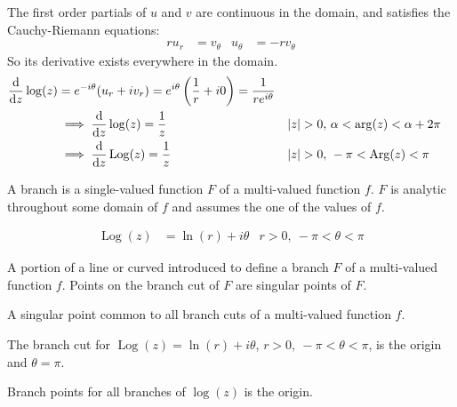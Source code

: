 \documentclass[12pt, english]{book}
\begin{document}
	The first order partials of \(u\) and \(v\) are continuous in the domain, and satisfies the Cauchy-Riemann equations:
	\begin{align*}
		ru_r &= v_\theta & u_\theta &= -rv_\theta
	\end{align*}
	So its derivative exists everywhere in the domain. 
	\begin{align*}
		\dv{z} \log(z) &= e^{-i\theta} (u_r + iv_r) = e^{i\theta} \left(\frac{1}{r} + i0\right) = \frac{1}{re^{i\theta}} \\
		&\implies \dv{z} \log(z) = \frac{1}{z} & \abs{z}>0,& \ \alpha < \arg(z) < \alpha + 2\pi\\
		&\implies \dv{z} \operatorname{Log}(z) = \frac{1}{z} & \abs{z}>0,& \ -\pi < \operatorname{Arg}(z) < \pi
	\end{align*}

	\begin{definition}[Branch]
		\label{Branch Definition - Complex}
		A branch is a single-valued function \(F\) of a multi-valued function \(f\). \(F\) is analytic throughout some domain of \(f\) and assumes the one of the values of \(f\).
	\end{definition}
	
	\begin{definition}
		\label{Principal Branch Definition - Complex}
		\begin{align*}
			\operatorname{Log}(z) &= \ln(r) + i\theta & r>0, \ -\pi < \theta < \pi
		\end{align*}
	\end{definition}

	\begin{definition}
		\label{Branch Cut Definition - Complex}
		A portion of a line or curved introduced to define a branch \(F\) of a multi-valued function \(f\). Points on the branch cut of \(F\) are singular points of \(F\).
	\end{definition}

	\begin{definition}
		\label{Branch Point Definition - Complex}
		A singular point common to all branch cuts of a multi-valued function \(f\).
	\end{definition}

	\begin{example}
		The branch cut for \(\operatorname{Log}(z) = \ln(r) + i\theta\), \(r>0,\ -\pi<\theta<\pi\), is the origin and \(\theta = \pi\).
		
		Branch points for all branches of \(\log(z)\) is the origin.
	\end{example}
	
\end{document}

